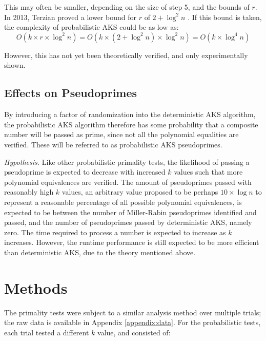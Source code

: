 \documentclass{article}
\begin{document}
This may often be smaller, depending on the size of step 5, and the bounds of $r$. In 2013, Terzian proved a lower bound for $r$ of $2 + \log^2{n}$ \cite{terzian_aks_2013}. If this bound is taken, the complexity of probabilistic AKS could be as low as:
\[O(k \times r \times \log^2{n}) = O(k \times (2 + \log^2{n}) \times \log^2{n}) = O(k \times \log^4{n})\]

However, this has not yet been theoretically verified, and only experimentally shown.

\subsection{Effects on Pseudoprimes}
By introducing a factor of randomization into the deterministic AKS algorithm, the probabilistic AKS algorithm therefore has some probability that a composite number will be passed as prime, since not all the polynomial equalities are verified. These will be referred to as probabilistic AKS pseudoprimes.

\emph{Hypothesis.} Like other probabilistic primality tests, the likelihood of passing a pseudoprime is expected to decrease with increased $k$ values such that more polynomial equivalences are verified. The amount of pseudoprimes passed with reasonably high $k$ values, an arbitrary value proposed to be perhaps $10 \times \log{n}$ to represent a reasonable percentage of all possible polynomial equivalences, is expected to be between the number of Miller-Rabin pseudoprimes identified and passed, and the number of pseudoprimes passed by deterministic AKS, namely zero. The time required to process a number is expected to increase as $k$ increases. However, the runtime performance is still expected to be more efficient than deterministic AKS, due to the theory mentioned above.

\section{Methods}
The primality tests were subject to a similar analysis method over multiple trials; the raw data is available in Appendix \ref{appendix:data}. For the probabilistic tests, each trial tested a different $k$ value, and consisted of:
\end{document}
